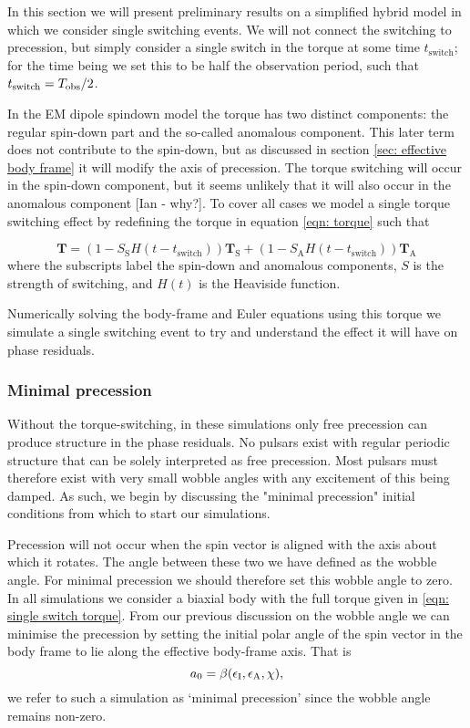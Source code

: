 \documentclass[../full_thesis/full_thesis.tex]{subfiles}
\begin{document}
In this section we will present preliminary results on a simplified hybrid model
in which we consider single switching events. We will not connect the switching
to precession, but simply consider a single switch in the torque at some time
$t_{\mathrm{switch}}$; for the time being we set this to be half the
observation period, such that $t_{\mathrm{switch}} = T_{\textrm{obs}}/2$.

In the EM dipole spindown model the torque has two distinct components: the
regular spin-down part and the so-called anomalous component. This later term 
does not contribute to the spin-down, but as discussed in section \ref{sec: effective
body frame} it will modify the axis of precession. The torque switching will 
occur in the spin-down component, but it seems unlikely that it will also
occur in the anomalous component [Ian - why?]. To cover all cases we 
model a single torque switching effect by redefining the torque in equation
\eqref{eqn: torque} such that

\newcommand{\Ss}{S_{\mathrm{S}}}
\newcommand{\Sa}{S_{\mathrm{A}}}

\begin{equation}
\mathbf{T} = (1 - \Ss H(t-t_{\mathrm{switch}})) \mathbf{T}_{\mathrm{S}}+
                 (1 - \Sa H(t-t_{\mathrm{switch}})) \mathbf{T}_{\mathrm{A}}
\label{eqn: single switch torque}
\end{equation} 
where the subscripts label the spin-down and anomalous components, $S$ is the
strength of switching, and $H(t)$ is the Heaviside function. 

Numerically solving the body-frame and Euler equations using this torque we 
simulate a single switching event to try and understand the effect it will have
on phase residuals. 

\subsubsection{Minimal precession}
Without the torque-switching, in these simulations only free precession can 
produce structure in the phase residuals. No pulsars exist with regular periodic
structure that can be solely interpreted as free precession. Most pulsars must 
therefore exist with very small wobble angles with any excitement of this being
damped. As such, we begin by discussing the "minimal precession" initial 
conditions from which to start our simulations. 


Precession will not occur when the spin vector is aligned with the axis about
which it rotates. The angle between these two we have defined as the wobble
angle.  For minimal precession we should therefore set this wobble angle to
zero. In all simulations we consider a biaxial body with the full torque given
in \eqref{eqn: single switch torque}. From our previous discussion on the 
wobble angle we can minimise the precession by setting the initial polar angle
of the spin vector in the body frame to lie along the effective body-frame 
axis. That is
\begin{equation}
a_{0} = \beta(\epsilon_{\mathrm{I}}, \epsilon_{\mathrm{A}}, \chi),
\end{equation}
we refer to such a simulation as `minimal precession' since the wobble angle 
remains non-zero.
\end{document}

